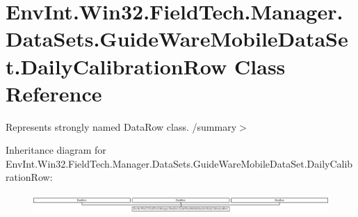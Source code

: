 \hypertarget{class_env_int_1_1_win32_1_1_field_tech_1_1_manager_1_1_data_sets_1_1_guide_ware_mobile_data_set_1_1_daily_calibration_row}{}\section{Env\+Int.\+Win32.\+Field\+Tech.\+Manager.\+Data\+Sets.\+Guide\+Ware\+Mobile\+Data\+Set.\+Daily\+Calibration\+Row Class Reference}
\label{class_env_int_1_1_win32_1_1_field_tech_1_1_manager_1_1_data_sets_1_1_guide_ware_mobile_data_set_1_1_daily_calibration_row}


Represents strongly named Data\+Row class. /summary$>$  


Inheritance diagram for Env\+Int.\+Win32.\+Field\+Tech.\+Manager.\+Data\+Sets.\+Guide\+Ware\+Mobile\+Data\+Set.\+Daily\+Calibration\+Row\+:\begin{figure}[H]
\begin{center}
\leavevmode
\includegraphics[height=0.704403cm]{class_env_int_1_1_win32_1_1_field_tech_1_1_manager_1_1_data_sets_1_1_guide_ware_mobile_data_set_1_1_daily_calibration_row}
\end{center}
\end{figure}
